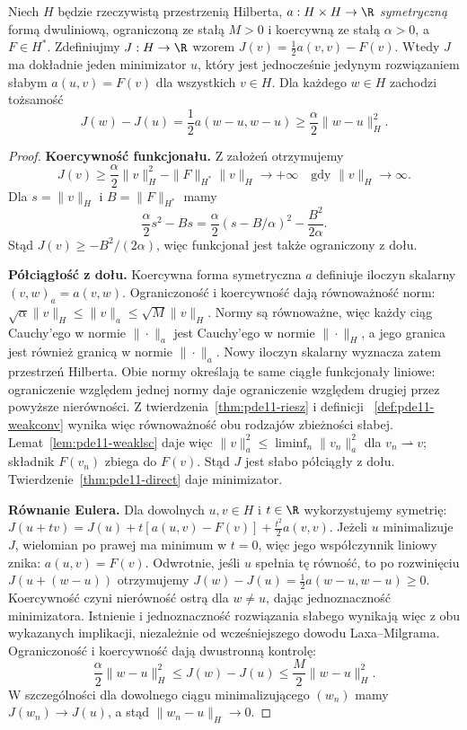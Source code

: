 \begin{twierdzenie}
\label{thm:pde11-dirichlet}
Niech $H$ będzie rzeczywistą przestrzenią Hilberta,
$a:H\times H\to\R$ \emph{symetryczną} formą dwuliniową,
ograniczoną ze stałą $M>0$ i koercywną ze stałą
$\alpha>0$, a $F\in H^*$.
Zdefiniujmy $J:H\to\R$ wzorem
$J(v)=\frac12 a(v,v)-F(v)$.
Wtedy $J$ ma dokładnie jeden minimizator $u$, który jest
jednocześnie jedynym rozwiązaniem słabym
$a(u,v)=F(v)$ dla wszystkich $v\in H$.
Dla każdego $w\in H$ zachodzi tożsamość
\[ J(w)-J(u)=\frac12a(w-u,w-u)
\ge\frac\alpha2\|w-u\|_H^2. \]
\end{twierdzenie}
\begin{proof}
\textbf{Koercywność funkcjonału.} Z założeń otrzymujemy
\[ J(v)\ge\frac\alpha2\|v\|_H^2
 -\|F\|_{H^*}\|v\|_H\longrightarrow+\infty
 \quad\text{gdy }\|v\|_H\to\infty. \]
Dla $s=\|v\|_H$ i $B=\|F\|_{H^*}$ mamy
\[
 \frac{\alpha}{2}s^2-Bs
 =\frac{\alpha}{2}(s-B/\alpha)^2-\frac{B^2}{2\alpha}.
\]
Stąd $J(v)\ge-B^2/(2\alpha)$, więc funkcjonał
jest także ograniczony z dołu.

\textbf{Półciągłość z dołu.} Koercywna forma symetryczna
$a$ definiuje iloczyn skalarny $(v,w)_a=a(v,w)$.
Ograniczoność i koercywność dają równoważność norm:
$\sqrt\alpha\|v\|_H\le\|v\|_a\le\sqrt M\|v\|_H$.
Normy są równoważne, więc każdy ciąg Cauchy'ego
w normie $\|\cdot\|_a$ jest Cauchy'ego w normie
$\|\cdot\|_H$, a jego granica jest również granicą
w normie $\|\cdot\|_a$. Nowy iloczyn skalarny
wyznacza zatem przestrzeń Hilberta. Obie normy
określają te same ciągłe funkcjonały liniowe:
ograniczenie względem jednej normy daje ograniczenie
względem drugiej przez powyższe nierówności.
Z twierdzenia~\ref{thm:pde11-riesz} i definicji
~\ref{def:pde11-weakconv} wynika więc równoważność
obu rodzajów zbieżności słabej.
Lemat~\ref{lem:pde11-weaklsc} daje więc
$\|v\|_a^2\le\liminf_n\|v_n\|_a^2$
dla $v_n\rightharpoonup v$; składnik $F(v_n)$ zbiega do $F(v)$.
Stąd $J$ jest słabo półciągły z dołu.
Twierdzenie~\ref{thm:pde11-direct} daje minimizator.

\textbf{Równanie Eulera.} Dla dowolnych $u,v\in H$
i $t\in\R$ wykorzystujemy symetrię:
$J(u+tv)=J(u)+t[a(u,v)-F(v)]+\frac{t^2}{2}a(v,v)$.
Jeżeli $u$ minimalizuje $J$, wielomian po prawej ma
minimum w $t=0$, więc jego współczynnik liniowy znika:
$a(u,v)=F(v)$. Odwrotnie, jeśli $u$ spełnia tę równość,
to po rozwinięciu $J(u+(w-u))$ otrzymujemy
$J(w)-J(u)=\frac12a(w-u,w-u)\ge0$.
Koercywność czyni nierówność ostrą dla $w\ne u$,
dając jednoznaczność minimizatora. Istnienie i
jednoznaczność rozwiązania słabego wynikają więc
z obu wykazanych implikacji, niezależnie od
wcześniejszego dowodu Laxa--Milgrama.
Ograniczoność i koercywność dają dwustronną kontrolę:
\[
 \frac{\alpha}{2}\|w-u\|_H^2
 \le J(w)-J(u)\le\frac{M}{2}\|w-u\|_H^2.
\]
W szczególności dla dowolnego ciągu minimalizującego
$(w_n)$ mamy $J(w_n)\to J(u)$, a stąd
$\|w_n-u\|_H\to0$.
\end{proof}

